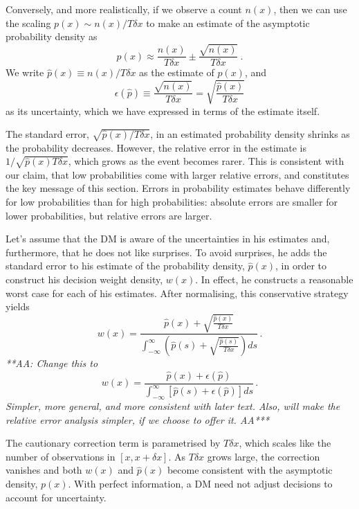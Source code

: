 \documentclass[a4paper, 12pt]{article}
\newcommand{\elabel}[1]{\label{eq:#1}}
\newcommand{\err}{\epsilon}
\newcommand{\be}{\begin{equation}}
\newcommand{\ee}{\end{equation}}
\renewcommand{\AA}[1]{{\it ***AA: #1 AA***}}
\begin{document}
Conversely, and more realistically, if we observe a count $n(x)$, then we can use the scaling $ p(x) \sim n(x)/T\delta x$ to make an estimate of the asymptotic probability density as
\be
p(x) \approx \frac{n(x)}{T\delta x} \pm \frac{\sqrt{n(x)}}{T \delta x} ~.
\elabel{prob_est}
\ee
We write $\hat{p}(x) \equiv n(x)/T\delta x$ as the estimate of $p(x)$, and
\be
\err(\hat{p}) \equiv \frac{\sqrt{n(x)}}{T \delta x} = \sqrt{\frac{\hat{p}(x)}{T \delta x}}
\ee
as its uncertainty, which we have expressed in terms of the estimate itself.

The standard error, $ \sqrt{\hat{p}(x)/T \delta x}$, in an estimated probability density shrinks as the probability decreases. However, the relative error in the estimate is $1/\sqrt{\hat{p}(x)T\delta x}$, which grows as the event becomes rarer. This is consistent with our claim, that low probabilities come with larger relative errors, and constitutes the key message of this section. Errors in probability estimates behave differently for low probabilities than for high probabilities: absolute errors are smaller for lower probabilities, but relative errors are larger. 

Let's assume that the DM is aware of the uncertainties in his estimates and, furthermore, that he does not like surprises. To avoid surprises, he adds the standard error to his estimate of the probability density, $\hat{p}(x)$, in order to construct his decision weight density, $w(x)$. In effect, he constructs a reasonable worst case for each of his estimates. After normalising, this conservative strategy yields
\be
w(x)=\frac{\hat{p}(x)+\sqrt{\frac{\hat{p}(x)}{T \delta x}}}{\int_{-\infty}^{\infty}\left(\hat{p}(s)+\sqrt{\frac{\hat{p}(s)}{T \delta x}}\right)ds}\,.
\elabel{weight_density}
\ee
\AA{Change this to
\be
w(x)=\frac{\hat{p}(x)+\err(\hat{p})}{\int_{-\infty}^{\infty}\left[\hat{p}(s)+\err(\hat{p})\right]ds}\,.
\ee
Simpler, more general, and more consistent with later text. Also, will make the relative error analysis simpler, if we choose to offer it.}

The cautionary correction term is parametrised by $T\delta x$, which scales like the number of observations in $[x, x+\delta x]$. As $T\delta x$ grows large, the correction vanishes and both $w(x)$ and $\hat{p}(x)$ become consistent with the asymptotic density, $p(x)$. With perfect information, a DM need not adjust decisions to account for uncertainty.
\end{document}
